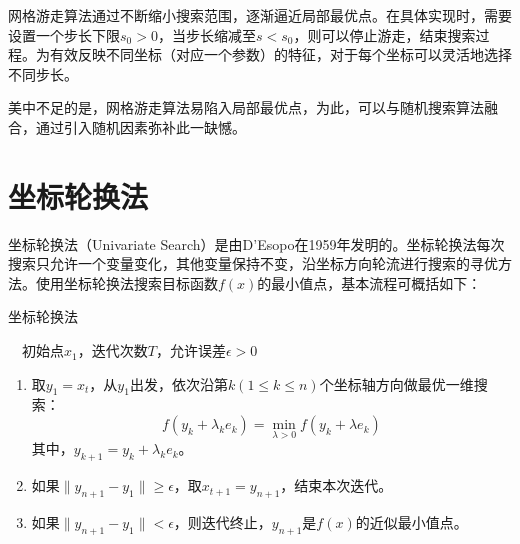 网格游走算法通过不断缩小搜索范围，逐渐逼近局部最优点。在具体实现时，需要设置一个步长下限$s_0>0$，当步长缩减至$s<s_0$，则可以停止游走，结束搜索过程。为有效反映不同坐标（对应一个参数）的特征，对于每个坐标可以灵活地选择不同步长。

美中不足的是，网格游走算法易陷入局部最优点，为此，可以与随机搜索算法融合，通过引入随机因素弥补此一缺憾。

\section{坐标轮换法}
坐标轮换法（Univariate Search）是由D'Esopo\cite{desopo1959convex}在1959年发明的。坐标轮换法每次搜索只允许一个变量变化，其他变量保持不变，沿坐标方向轮流进行搜索的寻优方法。使用坐标轮换法搜索目标函数$f(x)$的最小值点，基本流程可概括如下：

\begin{algorithm}[htbp]
        \caption{坐标轮换法}
        \begin{algorithmic}
            \REQUIRE ~~初始点$x_1$，迭代次数$T$，允许误差$\epsilon>0$\\
            \STATE
            \begin{enumerate}
                \item 取$y_1 = x_t$，从$y_1$出发，依次沿第$k(1\le k\le n)$个坐标轴方向做最优一维搜索：
                \[
                    f(y_k + \lambda_k e_k) = \min\limits_{\lambda>0} f(y_k + \lambda e_k)
                \]
                其中，$y_{k+1} = y_k + \lambda_k e_k$。
                \item 如果$\|y_{n+1} - y_1\| \ge \epsilon$，取$x_{t+1} = y_{n+1}$，结束本次迭代。
                \item 如果$\|y_{n+1} - y_1\| < \epsilon$，则迭代终止，$y_{n+1}$是$f(x)$的近似最小值点。
            \end{enumerate}
            \ENDFOR
        \end{algorithmic}
\end{algorithm}

